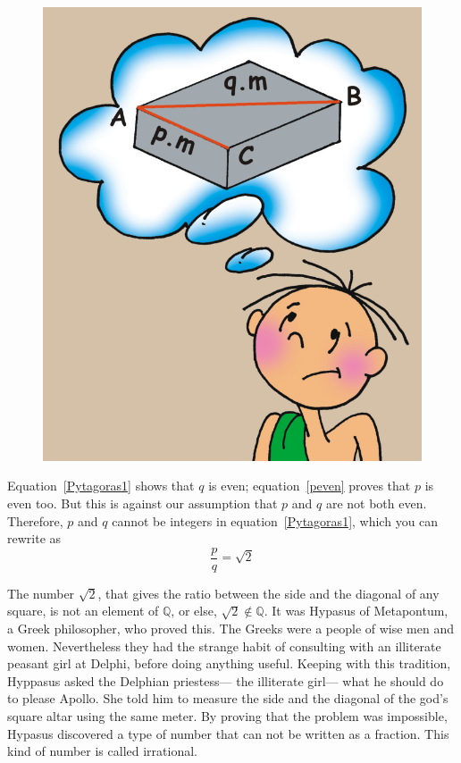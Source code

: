 \documentclass[a4paper,12pt]{book}
\begin{document}
\begin{figure}
\begin{center}
\includegraphics[scale=0.5]{fig-sets/apoloa.png}
\end{center}
\end{figure}
Equation~\ref{Pytagoras1} shows that $q$ is even;
equation~\ref{peven} proves that $p$ is even too. But this is against our
assumption that $p$ and $q$ are not both even. Therefore, $p$ and $q$ cannot be
integers in equation~\ref{Pytagoras1}, which you can rewrite as
$$\frac{p}{q}=\sqrt{2}$$



The number $\sqrt 2$, that gives the ratio
between the side and the diagonal of any square, is not an element of $\mathbb{Q}$,
or else, $\sqrt 2 \notin  \mathbb{Q}$. It was Hypasus of Metapontum, a Greek philosopher,
who proved this. The Greeks were a people of wise men and women. Nevertheless they
had the strange habit of consulting with an illiterate peasant girl at Delphi,
before doing anything useful. Keeping with this tradition, Hyppasus  asked
the Delphian priestess--- the illiterate girl--- what he should do to please Apollo.
She told him to measure  the side and the diagonal of the god's square
altar using the same meter. By proving
that the problem was impossible, Hypasus discovered a type of number that can not be
written as a fraction. This kind of number is called irrational.
\end{document}

